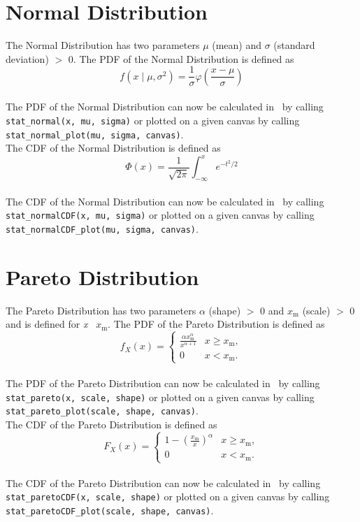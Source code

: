 	\section{Normal Distribution}
	
		The Normal Distribution has two parameters $\mu$ (mean) and $\sigma$ (standard deviation) $>$ 0. The \ac{PDF} of the Normal Distribution is defined as
		\\
		$$f(x \mid \mu, \sigma^2) =\frac 1 \sigma \varphi\left(\frac{x-\mu} \sigma \right)$$
		\\[0.3cm]
		The \ac{PDF} of the Normal Distribution can now be calculated in \setlx\ by calling \lstinline{stat_normal(x, mu, sigma)} or plotted on a given canvas by calling \lstinline{stat_normal_plot(mu, sigma, canvas)}.
		\\[0.3cm]
		The \ac{CDF} of the Normal Distribution is defined as
		\\
		$$\Phi(x) = \frac 1 {\sqrt{2\pi}} \int_{-\infty}^x e^{-t^2/2}$$
		\\[0.3cm]
		The \ac{CDF} of the Normal Distribution can now be calculated in \setlx\ by calling \lstinline{stat_normalCDF(x, mu, sigma)} or plotted on a given canvas by calling \lstinline{stat_normalCDF_plot(mu, sigma, canvas)}.
		
	\section{Pareto Distribution}
	
		The Pareto Distribution has two parameters $\alpha$ (shape) $>$ 0 and $x_\mathrm{m}$ (scale) $>$ 0 and is defined for \textit{x} \geq\ $x_\mathrm{m}$. The \ac{PDF} of the Pareto Distribution is defined as
		\\
		$$f_X(x)= \begin{cases} \frac{\alpha x_\mathrm{m}^\alpha}{x^{\alpha+1}} & x \ge x_\mathrm{m}, \\ 0 & x < x_\mathrm{m}. \end{cases}$$
		\\[0.3cm]
		The \ac{PDF} of the Pareto Distribution can now be calculated in \setlx\ by calling \lstinline{stat_pareto(x, scale, shape)} or plotted on a given canvas by calling \lstinline{stat_pareto_plot(scale, shape, canvas)}.
		\\[0.3cm]
		The \ac{CDF} of the Pareto Distribution is defined as
		\\
		$$F_X(x) = \begin{cases}1-\left(\frac{x_\mathrm{m}}{x}\right)^\alpha & x \ge x_\mathrm{m}, \\0 & x < x_\mathrm{m}.\end{cases}$$
		\\[0.3cm]
		The \ac{CDF} of the Pareto Distribution can now be calculated in \setlx\ by calling \lstinline{stat_paretoCDF(x, scale, shape)} or plotted on a given canvas by calling \lstinline{stat_paretoCDF_plot(scale, shape, canvas)}.
		

